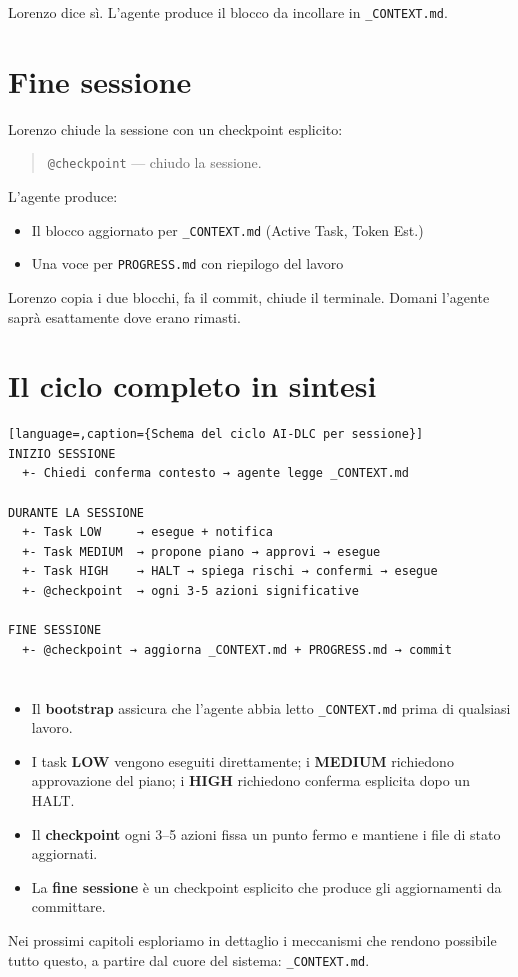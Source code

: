 Lorenzo dice sì. L'agente produce il blocco da incollare in \texttt{\_CONTEXT.md}.

\section{Fine sessione}
\label{sec:03-fine-sessione}

Lorenzo chiude la sessione con un checkpoint esplicito:

\begin{quote}
\texttt{@checkpoint} --- chiudo la sessione.
\end{quote}

L'agente produce:
\begin{itemize}
  \item Il blocco aggiornato per \texttt{\_CONTEXT.md} (Active Task, Token Est.)
  \item Una voce per \texttt{PROGRESS.md} con riepilogo del lavoro
\end{itemize}

Lorenzo copia i due blocchi, fa il commit, chiude il terminale. Domani l'agente saprà esattamente dove erano rimasti.

\section{Il ciclo completo in sintesi}
\label{sec:03-ciclo}

\begin{lstlisting}[language=,caption={Schema del ciclo AI-DLC per sessione}]
INIZIO SESSIONE
  +- Chiedi conferma contesto → agente legge _CONTEXT.md

DURANTE LA SESSIONE
  +- Task LOW     → esegue + notifica
  +- Task MEDIUM  → propone piano → approvi → esegue
  +- Task HIGH    → HALT → spiega rischi → confermi → esegue
  +- @checkpoint  → ogni 3-5 azioni significative

FINE SESSIONE
  +- @checkpoint → aggiorna _CONTEXT.md + PROGRESS.md → commit
\end{lstlisting}


\section*{\LabelSummary}

\begin{itemize}
  \item Il \textbf{bootstrap} assicura che l'agente abbia letto \texttt{\_CONTEXT.md} prima di qualsiasi lavoro.
  \item I task \textbf{LOW} vengono eseguiti direttamente; i \textbf{MEDIUM} richiedono approvazione del piano; i \textbf{HIGH} richiedono conferma esplicita dopo un HALT.
  \item Il \textbf{checkpoint} ogni 3--5 azioni fissa un punto fermo e mantiene i file di stato aggiornati.
  \item La \textbf{fine sessione} è un checkpoint esplicito che produce gli aggiornamenti da committare.
\end{itemize}

Nei prossimi capitoli esploriamo in dettaglio i meccanismi che rendono possibile tutto questo, a partire dal cuore del sistema: \texttt{\_CONTEXT.md}.
